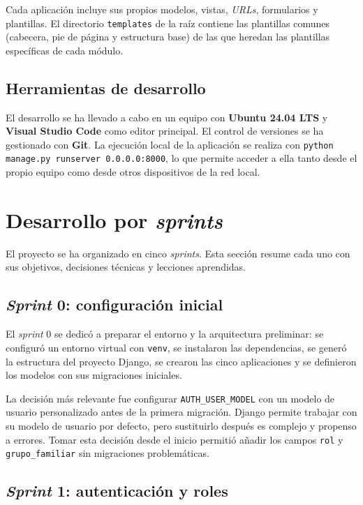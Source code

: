 Cada aplicación incluye sus propios modelos, vistas, \emph{URLs},
formularios y plantillas. El directorio \texttt{templates} de la raíz
contiene las plantillas comunes (cabecera, pie de página y estructura
base) de las que heredan las plantillas específicas de cada módulo.

\subsection{Herramientas de
desarrollo\label{SUB:IMP_HERRAMIENTAS}}

El desarrollo se ha llevado a cabo en un equipo con \textbf{Ubuntu 24.04
LTS} y \textbf{Visual Studio Code} como editor principal. El control de
versiones se ha gestionado con \textbf{Git}. La ejecución local de la
aplicación se realiza con \texttt{python manage.py runserver
0.0.0.0:8000}, lo que permite acceder a ella tanto desde el propio equipo
como desde otros dispositivos de la red local.


\section{Desarrollo por \emph{sprints}\label{SEC:IMP_SPRINTS}}

El proyecto se ha organizado en cinco \emph{sprints}. Esta sección resume
cada uno con sus objetivos, decisiones técnicas y lecciones aprendidas.

\subsection{\emph{Sprint} 0: configuración
inicial\label{SUB:SPRINT_0}}

El \emph{sprint} 0 se dedicó a preparar el entorno y la arquitectura
preliminar: se configuró un entorno virtual con \texttt{venv}, se
instalaron las dependencias, se generó la estructura del proyecto Django,
se crearon las cinco aplicaciones y se definieron los modelos con sus
migraciones iniciales.

La decisión más relevante fue configurar \texttt{AUTH\_USER\_MODEL} con
un modelo de usuario personalizado antes de la primera migración. Django
permite trabajar con su modelo de usuario por defecto, pero sustituirlo
después es complejo y propenso a errores. Tomar esta decisión desde el
inicio permitió añadir los campos \texttt{rol} y \texttt{grupo\_familiar}
sin migraciones problemáticas.

\subsection{\emph{Sprint} 1: autenticación y
roles\label{SUB:SPRINT_1}}

